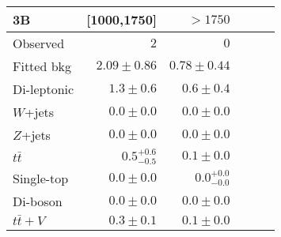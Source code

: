 \documentclass{article}
\begin{document}
\begin{tabular*}{\textwidth}{@{\extracolsep{\fill}}lrrrrr}
\toprule
\textbf{3B} & [1000,1750] & $>1750$ \\
\midrule
Observed          & $2$              & $0$                    \\
\midrule
Fitted bkg         & $2.09 \pm 0.86$          & $0.78 \pm 0.44$              \\
\midrule
        Di-leptonic         & $1.3 \pm 0.6$          & $0.6 \pm 0.4$              \\
        $W$+jets         & $0.0 \pm 0.0$          & $0.0 \pm 0.0$              \\
        $Z$+jets         & $0.0 \pm 0.0$          & $0.0 \pm 0.0$              \\
        $t\bar{t}$         & $0.5_{-0.5}^{+0.6}$          & $0.1 \pm 0.0$              \\
        Single-top         & $0.0 \pm 0.0$          & $0.0_{-0.0}^{+0.0}$              \\
        Di-boson         & $0.0 \pm 0.0$          & $0.0 \pm 0.0$              \\
        $t\bar{t}+V$         & $0.3 \pm 0.1$          & $0.1 \pm 0.0$              \\


\bottomrule
\end{tabular*}
\end{document}
